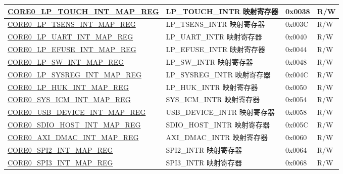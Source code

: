 \begin{longtable}{ | p{8.7cm} | p{6.2cm} | p{1.3cm} | p{1cm} | }
\hyperref[regdesc:CORE0LPTOUCHINTMAPREG]{CORE0\_LP\_TOUCH\_INT\_MAP\_REG} & LP\_TOUCH\_INTR 映射寄存器 & 0x0038 & R/W \\ \hline

\hyperref[regdesc:CORE0LPTSENSINTMAPREG]{CORE0\_LP\_TSENS\_INT\_MAP\_REG} & LP\_TSENS\_INTR 映射寄存器 & 0x003C & R/W \\ \hline

\hyperref[regdesc:CORE0LPUARTINTMAPREG]{CORE0\_LP\_UART\_INT\_MAP\_REG} & LP\_UART\_INTR 映射寄存器 & 0x0040 & R/W \\ \hline

\hyperref[regdesc:CORE0LPEFUSEINTMAPREG]{CORE0\_LP\_EFUSE\_INT\_MAP\_REG} & LP\_EFUSE\_INTR 映射寄存器 & 0x0044 & R/W \\ \hline

\hyperref[regdesc:CORE0LPSWINTMAPREG]{CORE0\_LP\_SW\_INT\_MAP\_REG} & LP\_SW\_INTR 映射寄存器 & 0x0048 & R/W \\ \hline

\hyperref[regdesc:CORE0LPSYSREGINTMAPREG]{CORE0\_LP\_SYSREG\_INT\_MAP\_REG} & LP\_SYSREG\_INTR 映射寄存器 & 0x004C & R/W \\ \hline

\hyperref[regdesc:CORE0LPHUKINTMAPREG]{CORE0\_LP\_HUK\_INT\_MAP\_REG} & LP\_HUK\_INTR 映射寄存器 & 0x0050 & R/W \\ \hline

\hyperref[regdesc:CORE0SYSICMINTMAPREG]{CORE0\_SYS\_ICM\_INT\_MAP\_REG} & SYS\_ICM\_INTR 映射寄存器 & 0x0054 & R/W \\ \hline

\hyperref[regdesc:CORE0USBDEVICEINTMAPREG]{CORE0\_USB\_DEVICE\_INT\_MAP\_REG} & USB\_DEVICE\_INTR 映射寄存器 & 0x0058 & R/W \\ \hline

\hyperref[regdesc:CORE0SDIOHOSTINTMAPREG]{CORE0\_SDIO\_HOST\_INT\_MAP\_REG} & SDIO\_HOST\_INTR 映射寄存器 & 0x005C & R/W \\ \hline

\hyperref[regdesc:CORE0AXIDMACINTMAPREG]{CORE0\_AXI\_DMAC\_INT\_MAP\_REG} & AXI\_DMAC\_INTR 映射寄存器 & 0x0060 & R/W \\ \hline

\hyperref[regdesc:CORE0SPI2INTMAPREG]{CORE0\_SPI2\_INT\_MAP\_REG} & SPI2\_INTR 映射寄存器 & 0x0064 & R/W \\ \hline

\hyperref[regdesc:CORE0SPI3INTMAPREG]{CORE0\_SPI3\_INT\_MAP\_REG} & SPI3\_INTR 映射寄存器 & 0x0068 & R/W \\ \hline


\end{longtable}
